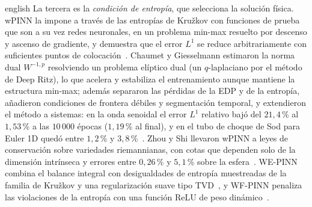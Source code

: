 \documentclass[../0000.tex]{subfiles}
\begin{document}
\begin{hyphenrules}{english}
La tercera es la \emph{condición de entropía}, que selecciona la solución física. wPINN la impone a través de las entropías de Kružkov con funciones de prueba que son a su vez redes neuronales, en un problema min-max resuelto por descenso y ascenso de gradiente, y demuestra que el error $L^1$ se reduce arbitrariamente con suficientes puntos de colocación~\cite{deryck2024wpinn}. Chaumet y Giesselmann estimaron la norma dual $W^{-1,p}$ resolviendo un problema elíptico dual (un $q$-laplaciano por el método de Deep Ritz), lo que acelera y estabiliza el entrenamiento aunque mantiene la estructura min-max; además separaron las pérdidas de la EDP y de la entropía, añadieron condiciones de frontera débiles y segmentación temporal, y extendieron el método a sistemas: en la onda senoidal el error $L^1$ relativo bajó del $21{,}4$\,\% al $1{,}53$\,\% a las $10\,000$ épocas ($1{,}19$\,\% al final), y en el tubo de choque de Sod para Euler 1D quedó entre $1{,}2$\,\% y $3{,}8$\,\%~\cite{chaumet2024improving}. Zhou y Shi llevaron wPINN a leyes de conservación sobre variedades riemannianas, con cotas que dependen solo de la dimensión intrínseca y errores entre $0{,}26$\,\% y $5{,}1$\,\% sobre la esfera~\cite{zhou2025weak}. WE-PINN combina el balance integral con desigualdades de entropía muestreadas de la familia de Kružkov y una regularización suave tipo TVD~\cite{oubarka2026weak}, y WF-PINN penaliza las violaciones de la entropía con una función ReLU de peso dinámico~\cite{wang2025wf}.


\end{hyphenrules}
\end{document}
